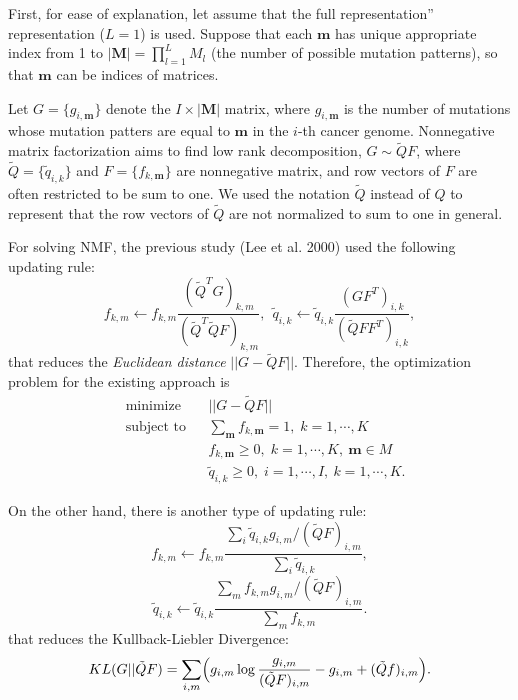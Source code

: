 \documentclass{article}
\begin{document}
First, for ease of explanation, let assume that the full representation'' representation ($L = 1$) is used.
Suppose that each $\bm{m}$ has unique appropriate index from 1 to  $| \bm{M} | = \prod_{l=1}^L M_l$ (the number of possible mutation patterns),
so that $\bm{m}$ can be indices of matrices.

Let $G = \{ g_{i, \bm{m}} \}$ denote the $I \times | \bm{M} | $ matrix, 
where $g_{i, \bm{m}}$ is the number of mutations whose mutation patters are equal to $\bm{m}$ in the $i$-th cancer genome.
Nonnegative matrix factorization aims to find low rank decomposition, 
$G \sim \tilde{Q} F$,
where $\tilde{Q} = \{ \tilde{q}_{i,k} \}$ and $F = \{ f_{k, \bm{m}} \}$ are nonnegative matrix, 
and row vectors of $F$ are often restricted to be sum to one. 
We used the notation $\tilde{Q}$ instead of $Q$
to represent that the row vectors of $\tilde{Q}$ are not normalized to sum to one in general.

For solving NMF, 
the previous study (Lee et al. 2000) used the following updating rule:
\begin{equation*}
f_{k,m} \gets f_{k,m} \frac{ ( \tilde{Q}^T G)_{k,m} }{ ( \tilde{Q}^T \tilde{Q} F  )_{k,m} },\  \
\tilde{q}_{i,k} \gets \tilde{q}_{i,k}  \frac{ (G F^T)_{i,k} }{ ( \tilde{Q} F F^T )_{i,k} },
\end{equation*}
that reduces the {\it Euclidean distance} $|| G - \tilde{Q} F ||$. 
Therefore, the optimization problem for the existing approach is
\begin{equation}
\begin{aligned}
& \text{minimize}
& & ||G - \tilde{Q} F || \\
& \text{subject to}
& & \sum_{ \bm{m} } f_{k, \bm{m}} =  1, \; k = 1, \cdots, K \\ &
& & f_{k, \bm{m}} \geq 0, \; k = 1, \cdots, K,\ \bm{m} \in M \\ & 
& & \tilde{q}_{i, k} \geq 0, \; i = 1, \cdots, I,\ k = 1, \cdots, K.
\end{aligned}
\end{equation}

On the other hand, there is another type of updating rule:
\begin{equation*}
f_{k,m} \gets f_{k,m} \frac{ \sum_i \tilde{q}_{i,k} g_{i,m} / ( \tilde{Q} F)_{i,m} }{ \sum_i \tilde{q}_{i,k} },
\end{equation*}
\begin{equation*}
\tilde{q}_{i,k} \gets \tilde{q}_{i,k}  \frac{ \sum_m f_{k,m} g_{i,m} / ( \tilde{Q} F)_{i,m} }{ \sum_m f_{k,m} }.
\end{equation*}
that reduces the Kullback-Liebler Divergence:
\begin{equation*}
KL(G ||  \tilde{Q} F) = \sum_{i,m} \Bigl( g_{i,m} \log  \frac{ g_{i,m} }{ (\tilde{Q} F)_{i,m} } - g_{i,m} + ( \tilde{Q} f )_{i,m} \Bigr).
\end{equation*}
\end{document}
